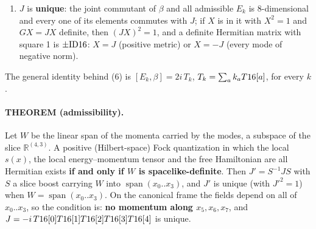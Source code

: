 \begin{enumerate}
        with $\beta$ and all five $E_k$ has $\Tr(GX)=0$, so $GX$ is never positive definite. Analytic
        proof for a purely hidden momentum: $[E_k,\beta]=2i\,k_5\,\Tsix{5}$, so $J'$ commutes with
        $\Tsix{5}$; $\Tsix{5}$ anticommutes with $G$, hence
        $\Tsix{5}^{\dagger}(GJ')\,\Tsix{5}=-(GJ')$: a positive matrix would be congruent to a negative
        one.
  \item $J$ is \textbf{unique}: the joint commutant of $\beta$ and all admissible $E_k$ is
        8-dimensional and every one of its elements commutes with $J$; if $X$ is in it with $X^2=1$
        and $GX=JX$ definite, then $(JX)^2=1$, and a definite Hermitian matrix with square 1 is
        $\pm\mathrm{ID16}$: $X=J$ (positive metric) or $X=-J$ (every mode of negative norm).
\end{enumerate}
The general identity behind (6) is $[E_k,\beta]=2i\,T_k$, $T_k=\sum_a k_aT16[a]$, for every $k$.

\paragraph{THEOREM (admissibility).} Let $W$ be the linear span of the momenta carried by the modes,
a subspace of the slice $\mathbb R^{(4,3)}$. A positive (Hilbert-space) Fock quantization in which
the local $s(x)$, the local energy--momentum tensor and the free Hamiltonian are all Hermitian exists
\textbf{if and only if $W$ is spacelike-definite}. Then $J'=S^{-1}JS$ with $S$ a slice boost carrying
$W$ into $\operatorname{span}(x_0..x_3)$, and $J'$ is unique (with $J'^2=1$) when
$W=\operatorname{span}(x_0..x_3)$. On the canonical frame the fields depend on all of $x_0..x_3$, so
the condition is: \textbf{no momentum along $x_5,x_6,x_7$}, and
$J=-i\,T16[0]T16[1]T16[2]T16[3]T16[4]$ is unique.

